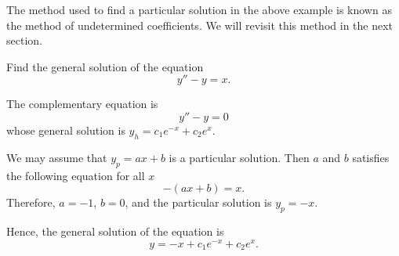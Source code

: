 The method used to find a particular solution in the above example is known as the method of undetermined coefficients. We will revisit this method in the next section.

\begin{exercise}
  Find the general solution of the equation
  \[y''-y=x.\]
\end{exercise}
\begin{exersol}
  The complementary equation is
  \[y''-y=0\]
  whose general solution is $y_h=c_1e^{-x}+c_2e^x$.

  We may assume that $y_p=ax+b$ is a particular solution. Then $a$ and $b$ satisfies the following equation for all $x$
  \[-(ax+b)=x.\]
  Therefore, $a=-1$, $b=0$, and the particular solution is $y_p=-x$.

  Hence, the general solution of the equation is
  \[y=-x+c_1e^{-x}+c_2e^x.\]
\end{exersol}

